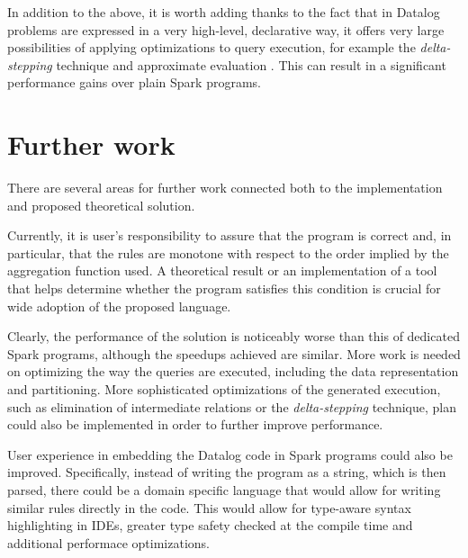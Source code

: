In addition to the above, it is worth adding thanks to the fact that in Datalog problems are expressed in a very high-level, declarative way, it offers very large possibilities of applying optimizations to query execution, for example the \emph{delta-stepping} technique and approximate evaluation \cite{distsoc}. This can result in a significant performance gains over plain Spark programs.


\section{Further work}

There are several areas for further work connected both to the implementation and proposed theoretical solution.

Currently, it is user's responsibility to assure that the program is correct and, in particular, that the rules are monotone with respect to the order implied by the aggregation function used. A theoretical result or an implementation of a tool that helps determine whether the program satisfies this condition is crucial for wide adoption of the proposed language.

Clearly, the performance of the solution is noticeably worse than this of dedicated Spark programs, although the speedups achieved are similar. More work is needed on optimizing the way the queries are executed, including the data representation and partitioning. More sophisticated optimizations of the generated execution, such as elimination of intermediate relations or the \emph{delta-stepping} technique, plan could also be implemented in order to further improve performance.

User experience in embedding the Datalog code in Spark programs could also be improved. Specifically, instead of writing the program as a string, which is then parsed, there could be a domain specific language that would allow for writing similar rules directly in the code. This would allow for type-aware syntax highlighting in IDEs, greater type safety checked at the compile time and additional performace optimizations.


